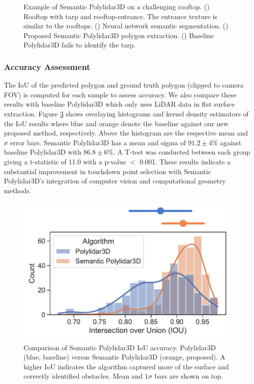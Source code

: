 \begin{figure}[ht]
\begin{subfigure}{.25\columnwidth}
    \caption{\label{fig:ch6_case1_e}}
  \end{subfigure}
  \caption[Example of Semantic Polylidar3D on a challenging rooftop]{Example of Semantic Polylidar3D on a challenging rooftop. () Rooftop with tarp and rooftop-entrance. The entrance texture is similar to the rooftops.  () Neural network semantic segmentation. 
   () Proposed Semantic Polylidar3D polygon extraction. () Baseline Polylidar3D fails to identify the tarp. }\label{fig:ch6_case1}
\end{figure}


\subsubsection{Accuracy Assessment}

The IoU of the predicted polygon and ground truth polygon (clipped to camera FOV) is computed for each sample to assess accuracy. We also compare these results with baseline Polylidar3D which only uses LiDAR data in flat surface extraction. Figure \ref{fig:ch6_compare_algs} shows overlaying histograms and kernel density estimators of the IoU results where blue and orange denote the baseline against our new proposed method, respectively. Above the histogram are the respective mean and $\sigma$ error bars. Semantic Polylidar3D has a mean and sigma of $91.2 \pm 4\%$ against baseline Polylidar3D with $86.8 \pm 6\%$. A T-test was conducted between each group giving a t-statistic of 11.0 with a p-value $<$ 0.001. These results indicate a substantial improvement in touchdown point selection with Semantic Polylidar3D's integration of computer vision and computational geometry methods. 


\begin{figure}[ht!]
\centering
\includegraphics[width=.55\linewidth]{chapter_6_landingsim/figs/compare_algs_extra_2.pdf}
\caption[Comparison of Semantic Polylidar3D IoU accuracy]{Comparison of Semantic Polylidar3D IoU accuracy. Polylidar3D (blue, baseline) versus Semantic Polylidar3D (orange, proposed). A higher IoU indicates the algorithm captured more of the surface and correctly identified obstacles. Mean and $1\sigma$ bars are shown on top.}
\label{fig:ch6_compare_algs}
\end{figure}

